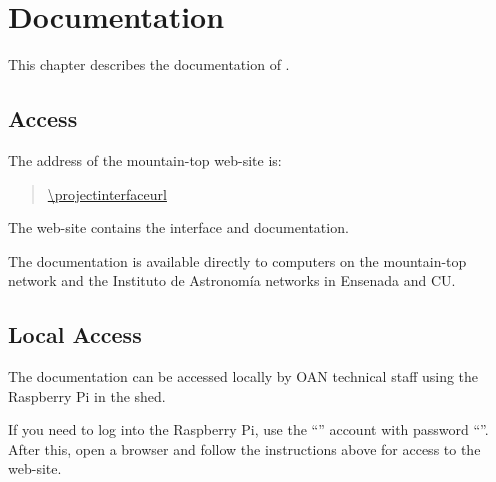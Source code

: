 \chapter{Documentation}
\label{chapter:documentation}

This chapter describes the documentation of {\projectname}.

\section{Access}

The address of the {\projectname} mountain-top web-site is:
\begin{quotation}
    \url{\projectinterfaceurl}
\end{quotation}

The web-site contains the interface and documentation.

The documentation is available directly to computers on the mountain-top network and the Instituto de Astronomía networks in Ensenada and CU.

\section{Local Access}
\label{section:documentation-local-access}

The documentation can be accessed locally by OAN technical staff using the Raspberry Pi in the shed.

If you need to log into the Raspberry Pi, use the “{\projectaccount}” account with password “{\projectaccount}”. After this, open a browser and follow the instructions above for access to the web-site.

